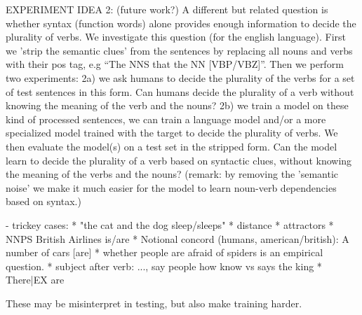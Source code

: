 EXPERIMENT IDEA 2:
(future work?) A different but related question is whether
syntax (function words) alone provides enough information 
to decide the plurality of verbs.
We investigate this question (for the english language). 
First we 'strip the semantic clues' from the sentences by replacing all nouns and verbs with their pos tag, e.g ``The NNS that the NN [VBP/VBZ]''. Then we perform two experiments: 
2a) we ask humans to decide the plurality of the verbs for a set of test sentences
in this form. Can humans decide the plurality of a verb without knowing the meaning of the verb and the nouns?
2b) we train a model on these kind of processed sentences,
we can train a language model and/or a more specialized model trained with the target
to decide the plurality of verbs.
We then evaluate the model(s) on a test set in the stripped form. 
Can the model learn to decide the plurality of a verb based on syntactic clues, without knowing the meaning of
the verbs and the nouns?
(remark: by removing the 'semantic noise' we make it much easier for the model to learn noun-verb dependencies based on syntax.)

- trickey cases:
* "the cat and the dog sleep/sleeps"
* distance
* attractors
* NNPS British Airlines is/are 
* Notional concord (humans, american/british): A number of cars [are]
* whether people are afraid of spiders is an empirical question.
* subject after verb: ..., say people how know vs says the king
* There|EX are

These may be misinterpret in testing, but also make training harder.